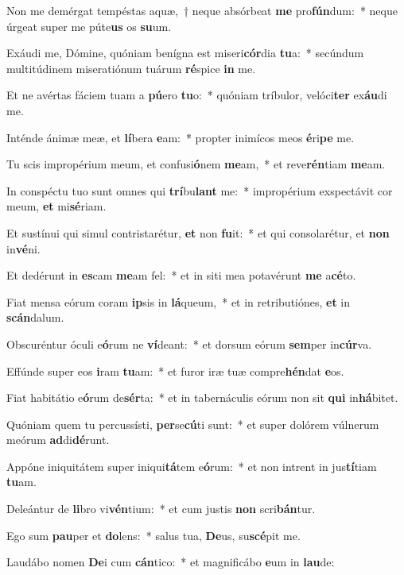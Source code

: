 \item Non me demérgat tempéstas aquæ,~† neque absórbeat \textbf{me} pro\textbf{fún}dum:~* neque úrgeat super me púte\textbf{us} os \textbf{su}um.
\item Exáudi me, Dómine, quóniam benígna est miseri\textbf{cór}dia \textbf{tu}a:~* secúndum multitúdinem miseratiónum tuárum \textbf{ré}spice \textbf{in} me.
\item Et ne avértas fáciem tuam a \textbf{pú}ero \textbf{tu}o:~* quóniam tríbulor, velóci\textbf{ter} ex\textbf{áu}di me.
\item Inténde ánimæ meæ, et \textbf{lí}bera \textbf{e}am:~* propter inimícos meos \textbf{é}ri\textbf{pe} me.
\item Tu scis impropérium meum, et confusi\textbf{ó}nem \textbf{me}am,~* et reve\textbf{rén}tiam \textbf{me}am.
\item In conspéctu tuo sunt omnes qui \textbf{trí}bu\textbf{lant} me:~* impropérium exspectávit cor meum, \textbf{et} mi\textbf{sé}riam.
\item Et sustínui qui simul contristarétur, \textbf{et} non \textbf{fu}it:~* et qui consolarétur, et \textbf{non} in\textbf{vé}ni.
\item Et dedérunt in \textbf{es}cam \textbf{me}am fel:~* et in siti mea potavérunt \textbf{me} a\textbf{cé}to.
\item Fiat mensa eórum coram \textbf{ip}sis in \textbf{lá}queum,~* et in retributiónes, \textbf{et} in \textbf{scán}dalum.
\item Obscuréntur óculi e\textbf{ó}rum ne \textbf{ví}deant:~* et dorsum eórum \textbf{sem}per in\textbf{cúr}va.
\item Effúnde super eos \textbf{i}ram \textbf{tu}am:~* et furor iræ tuæ compre\textbf{hén}dat \textbf{e}os.
\item Fiat habitátio e\textbf{ó}rum de\textbf{sér}ta:~* et in tabernáculis eórum non sit \textbf{qui} in\textbf{há}bitet.
\item Quóniam quem tu percussísti, \textbf{per}se\textbf{cú}ti sunt:~* et super dolórem vúlnerum meórum \textbf{ad}di\textbf{dé}runt.
\item Appóne iniquitátem super iniqui\textbf{tá}tem e\textbf{ó}rum:~* et non intrent in jus\textbf{tí}tiam \textbf{tu}am.
\item Deleántur de \textbf{li}bro vi\textbf{vén}tium:~* et cum justis \textbf{non} scri\textbf{bán}tur.
\item Ego sum \textbf{pau}per et \textbf{do}lens:~* salus tua, \textbf{De}us, su\textbf{scé}pit me.
\item Laudábo nomen \textbf{De}i cum \textbf{cán}tico:~* et magnificábo \textbf{e}um in \textbf{lau}de:
